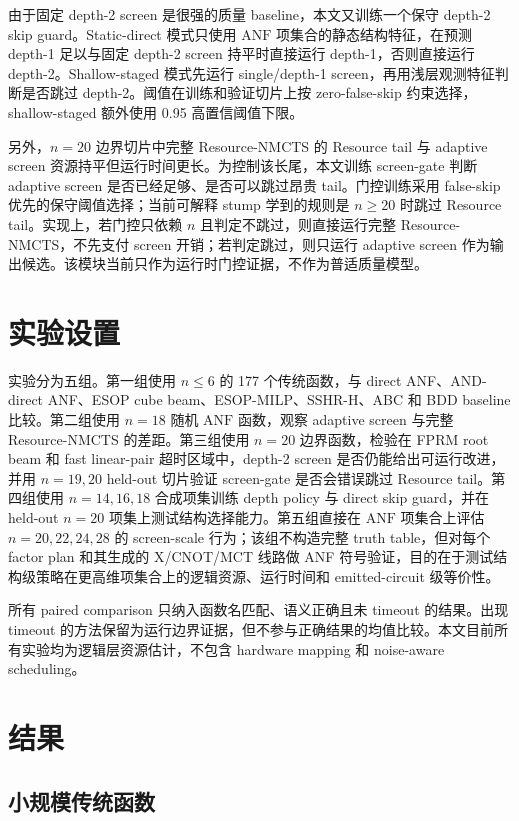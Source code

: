 \documentclass[UTF8,fontset=macnew,11pt]{ctexart}
\newcommand{\method}{Resource-NMCTS}
\newcommand{\anf}{\ensuremath{\mathrm{ANF}}}
\begin{document}
由于固定 depth-2 screen 是很强的质量 baseline，本文又训练一个保守 depth-2 skip guard。Static-direct 模式只使用 \anf{} 项集合的静态结构特征，在预测 depth-1 足以与固定 depth-2 screen 持平时直接运行 depth-1，否则直接运行 depth-2。Shallow-staged 模式先运行 single/depth-1 screen，再用浅层观测特征判断是否跳过 depth-2。阈值在训练和验证切片上按 zero-false-skip 约束选择，shallow-staged 额外使用 0.95 高置信阈值下限。

另外，$n=20$ 边界切片中完整 \method{} 的 Resource tail 与 adaptive screen 资源持平但运行时间更长。为控制该长尾，本文训练 screen-gate 判断 adaptive screen 是否已经足够、是否可以跳过昂贵 tail。门控训练采用 false-skip 优先的保守阈值选择；当前可解释 stump 学到的规则是 $n\geq20$ 时跳过 Resource tail。实现上，若门控只依赖 $n$ 且判定不跳过，则直接运行完整 \method{}，不先支付 screen 开销；若判定跳过，则只运行 adaptive screen 作为输出候选。该模块当前只作为运行时门控证据，不作为普适质量模型。

\section{实验设置}

实验分为五组。第一组使用 $n\leq6$ 的 177 个传统函数，与 direct ANF、AND-direct ANF、ESOP cube beam、ESOP-MILP、SSHR-H、ABC 和 BDD baseline 比较。第二组使用 $n=18$ 随机 \anf{} 函数，观察 adaptive screen 与完整 \method{} 的差距。第三组使用 $n=20$ 边界函数，检验在 FPRM root beam 和 fast linear-pair 超时区域中，depth-2 screen 是否仍能给出可运行改进，并用 $n=19,20$ held-out 切片验证 screen-gate 是否会错误跳过 Resource tail。第四组使用 $n=14,16,18$ 合成项集训练 depth policy 与 direct skip guard，并在 held-out $n=20$ 项集上测试结构选择能力。第五组直接在 \anf{} 项集合上评估 $n=20,22,24,28$ 的 screen-scale 行为；该组不构造完整 truth table，但对每个 factor plan 和其生成的 X/CNOT/MCT 线路做 ANF 符号验证，目的在于测试结构级策略在更高维项集合上的逻辑资源、运行时间和 emitted-circuit 级等价性。

所有 paired comparison 只纳入函数名匹配、语义正确且未 timeout 的结果。出现 timeout 的方法保留为运行边界证据，但不参与正确结果的均值比较。本文目前所有实验均为逻辑层资源估计，不包含 hardware mapping 和 noise-aware scheduling。

\section{结果}

\subsection{小规模传统函数}
\end{document}
